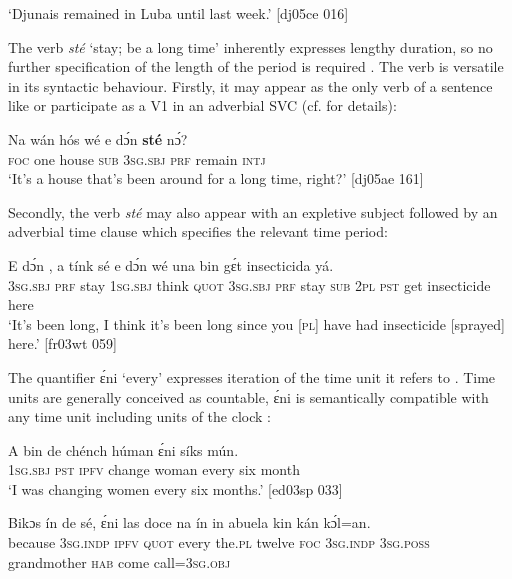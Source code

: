 \glt ‘Djunais remained in Luba until last week.’ [dj05ce 016]
\z

The verb \textit{sté} ‘stay; be a long time’ inherently expresses lengthy duration, so no further specification of the length of the period is required . The verb is versatile in its syntactic behaviour. Firstly, it may appear as the only verb of a sentence like  or participate as a V1 in an adverbial SVC (cf.  for details):


\ea%
    \label{ex:key:1035}
    \gll Na  wán  hós    wé  e    dɔ́n  \textbf{sté}    nɔ́?\\
\textsc{foc}  one  house  \textsc{sub}  \textsc{3sg.sbj}  \textsc{prf}  remain  \textsc{intj}\\

\glt ‘It’s a house that’s been around for a long time, right?’ [dj05ae 161]
\z

Secondly, the verb \textit{sté} may also appear with an expletive subject followed by an adverbial time clause which specifies the relevant time period:


\ea%
    \label{ex:key:1036}
    \gll E    dɔ́n  ,  a    tínk    sé    e    dɔ́n  
wé  una  bin  gɛ́t  insecticida  yá.\\
\textsc{3sg.sbj}  \textsc{prf}  stay  \textsc{1sg.sbj}  think  \textsc{quot}    \textsc{3sg.sbj}  \textsc{prf}  stay
\textsc{sub}  \textsc{2pl}  \textsc{pst}  get  insecticide  here\\

\glt ‘It’s been long, I think it’s been long since you [\textsc{pl}] have had insecticide 
[sprayed] here.’ [fr03wt 059]
\z

The quantifier{\fff} ɛ́ni ‘every’ expresses iteration of the time unit it refers to . Time units are generally conceived as countable, ɛ́ni is semantically compatible with any time unit including units of the clock :


\ea%
    \label{ex:key:1037}
    \gll A    bin  de  chénch  húman  ɛ́ni    síks  mún.\\
\textsc{1sg.sbj}  \textsc{pst}  \textsc{ipfv}  change  woman  every  six  month\\

\glt ‘I was changing women every six months.’ [ed03sp 033]
\z


\ea%
    \label{ex:key:1038}
    \gll Bikɔs  ín    de  sé,    ɛ́ni    las    doce  na  ín
in    abuela    kin  kán    kɔ́l=an.\\
because  \textsc{3sg.indp}  \textsc{ipfv}  \textsc{quot}    every  the.\textsc{pl}  twelve  \textsc{foc}  \textsc{3sg.indp}
\textsc{3sg.poss}  grandmother  \textsc{hab}  come  call=\textsc{3sg.obj}\\

